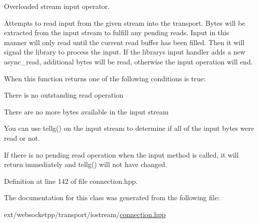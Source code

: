 Overloaded stream input operator. 

Attempts to read input from the given stream into the transport. Bytes will be extracted from the input stream to fulfill any pending reads. Input in this manner will only read until the current read buffer has been filled. Then it will signal the library to process the input. If the library\textquotesingle{}s input handler adds a new async\+\_\+read, additional bytes will be read, otherwise the input operation will end.

When this function returns one of the following conditions is true\+:
\begin{DoxyItemize}
\item There is no outstanding read operation
\item There are no more bytes available in the input stream
\end{DoxyItemize}

You can use tellg() on the input stream to determine if all of the input bytes were read or not.

If there is no pending read operation when the input method is called, it will return immediately and tellg() will not have changed. 

Definition at line 142 of file connection.\+hpp.



The documentation for this class was generated from the following file\+:\begin{DoxyCompactItemize}
\item 
ext/websocketpp/transport/iostream/\hyperlink{transport_2iostream_2connection_8hpp}{connection.\+hpp}\end{DoxyCompactItemize}
